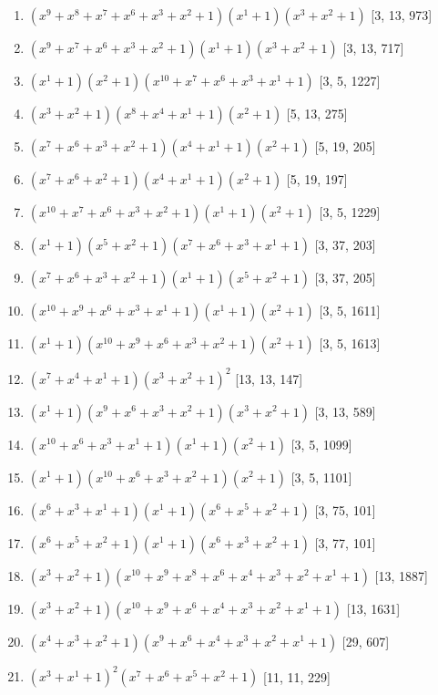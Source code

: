 \documentclass[10pt,twocolumn]{article}
\begin{document}
\begin{enumerate}
\item $(x^{9} + x^{8} + x^{7} + x^{6} + x^{3} + x^{2} + 1)(x^{1} + 1)(x^{3} + x^{2} + 1)$  [3, 13, 973]
\item $(x^{9} + x^{7} + x^{6} + x^{3} + x^{2} + 1)(x^{1} + 1)(x^{3} + x^{2} + 1)$  [3, 13, 717]
\item $(x^{1} + 1)(x^{2} + 1)(x^{10} + x^{7} + x^{6} + x^{3} + x^{1} + 1)$  [3, 5, 1227]
\item $(x^{3} + x^{2} + 1)(x^{8} + x^{4} + x^{1} + 1)(x^{2} + 1)$  [5, 13, 275]
\item $(x^{7} + x^{6} + x^{3} + x^{2} + 1)(x^{4} + x^{1} + 1)(x^{2} + 1)$  [5, 19, 205]
\item $(x^{7} + x^{6} + x^{2} + 1)(x^{4} + x^{1} + 1)(x^{2} + 1)$  [5, 19, 197]
\item $(x^{10} + x^{7} + x^{6} + x^{3} + x^{2} + 1)(x^{1} + 1)(x^{2} + 1)$  [3, 5, 1229]
\item $(x^{1} + 1)(x^{5} + x^{2} + 1)(x^{7} + x^{6} + x^{3} + x^{1} + 1)$  [3, 37, 203]
\item $(x^{7} + x^{6} + x^{3} + x^{2} + 1)(x^{1} + 1)(x^{5} + x^{2} + 1)$  [3, 37, 205]
\item $(x^{10} + x^{9} + x^{6} + x^{3} + x^{1} + 1)(x^{1} + 1)(x^{2} + 1)$  [3, 5, 1611]
\item $(x^{1} + 1)(x^{10} + x^{9} + x^{6} + x^{3} + x^{2} + 1)(x^{2} + 1)$  [3, 5, 1613]
\item $(x^{7} + x^{4} + x^{1} + 1)(x^{3} + x^{2} + 1)^{2}$  [13, 13, 147]
\item $(x^{1} + 1)(x^{9} + x^{6} + x^{3} + x^{2} + 1)(x^{3} + x^{2} + 1)$  [3, 13, 589]
\item $(x^{10} + x^{6} + x^{3} + x^{1} + 1)(x^{1} + 1)(x^{2} + 1)$  [3, 5, 1099]
\item $(x^{1} + 1)(x^{10} + x^{6} + x^{3} + x^{2} + 1)(x^{2} + 1)$  [3, 5, 1101]
\item $(x^{6} + x^{3} + x^{1} + 1)(x^{1} + 1)(x^{6} + x^{5} + x^{2} + 1)$  [3, 75, 101]
\item $(x^{6} + x^{5} + x^{2} + 1)(x^{1} + 1)(x^{6} + x^{3} + x^{2} + 1)$  [3, 77, 101]
\item $(x^{3} + x^{2} + 1)(x^{10} + x^{9} + x^{8} + x^{6} + x^{4} + x^{3} + x^{2} + x^{1} + 1)$  [13, 1887]
\item $(x^{3} + x^{2} + 1)(x^{10} + x^{9} + x^{6} + x^{4} + x^{3} + x^{2} + x^{1} + 1)$  [13, 1631]
\item $(x^{4} + x^{3} + x^{2} + 1)(x^{9} + x^{6} + x^{4} + x^{3} + x^{2} + x^{1} + 1)$  [29, 607]
\item $(x^{3} + x^{1} + 1)^{2}(x^{7} + x^{6} + x^{5} + x^{2} + 1)$  [11, 11, 229]

\end{enumerate}
\end{document}
